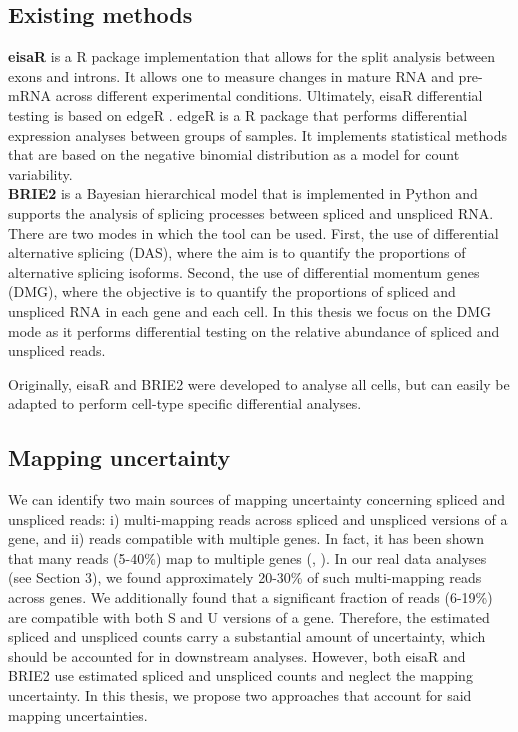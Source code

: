 \subsection{Existing methods}

\textbf{eisaR} \citep{eisar_package} is a R package implementation that allows for the split analysis between exons and introns. It allows one to measure changes in mature RNA and pre-mRNA across different experimental conditions. Ultimately, eisaR differential testing is based on edgeR \citep{edger}. edgeR is a R package that performs differential expression analyses between groups of samples. It implements statistical methods that are based on the negative binomial distribution as a model for count variability. \\

\noindent \textbf{BRIE2} \citep{brie2} is a Bayesian hierarchical model that is implemented in Python and supports the analysis of splicing processes between spliced and unspliced RNA. There are two modes in which the tool can be used. First, the use of differential alternative splicing (DAS), where the aim is to quantify the proportions of alternative splicing isoforms. Second, the use of differential momentum genes (DMG), where the objective is to quantify the proportions of spliced and unspliced RNA in each gene and each cell. In this thesis we focus on the DMG mode as it performs differential testing on the relative abundance of spliced and unspliced reads.

Originally, eisaR and BRIE2 were developed to analyse all cells, but can easily be adapted to perform cell-type specific differential analyses.

\subsection{Mapping uncertainty}
We can identify two main sources of mapping uncertainty concerning spliced and unspliced reads: i) multi-mapping reads across spliced and unspliced versions of a gene, and ii) reads compatible with multiple genes. In fact, it has been shown that many reads (5-40\%) map to multiple genes (\cite{mapping1}, \cite{mapping2}). In our real data analyses (see Section 3), we found approximately 20-30\% of such multi-mapping reads across genes. We additionally found that a significant fraction of reads (6-19\%) are compatible with both S and U versions of a gene. Therefore, the estimated spliced and unspliced counts carry a substantial amount of uncertainty, which should be accounted for in downstream analyses. However, both eisaR and BRIE2 use estimated spliced and unspliced counts and neglect the mapping uncertainty. In this thesis, we propose two approaches that account for said mapping uncertainties.
